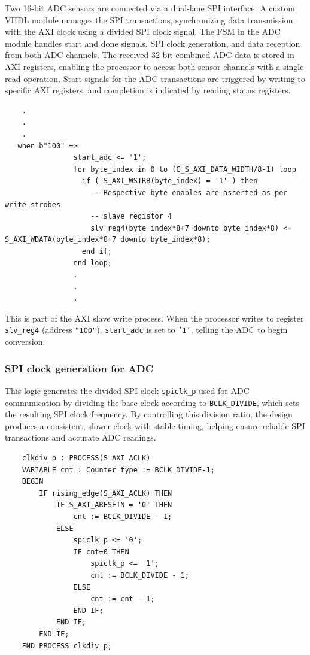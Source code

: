 Two 16-bit ADC sensors are connected via a dual-lane SPI interface. A custom VHDL module manages the SPI transactions, synchronizing data transmission with the AXI clock using a divided SPI clock signal. The FSM in the ADC module handles start and done signals, SPI clock generation, and data reception from both ADC channels. The received 32-bit combined ADC data is stored in AXI registers, enabling the processor to access both sensor channels with a single read operation. Start signals for the ADC transactions are triggered by writing to specific AXI registers, and completion is indicated by reading status registers.

\begin{verbatim}
	.
	.
	.
   when b"100" =>
	            start_adc <= '1';
	            for byte_index in 0 to (C_S_AXI_DATA_WIDTH/8-1) loop
	              if ( S_AXI_WSTRB(byte_index) = '1' ) then
	                -- Respective byte enables are asserted as per write strobes                   
	                -- slave registor 4
	                slv_reg4(byte_index*8+7 downto byte_index*8) <= S_AXI_WDATA(byte_index*8+7 downto byte_index*8);
	              end if;
	            end loop;
	            .
	            .
	            .
\end{verbatim}
This is part of the AXI slave write process. When the processor writes to register \texttt{slv\_reg4} (address \texttt{"100"}), \texttt{start\_adc} is set to \texttt{'1'}, telling the ADC to begin conversion.

\subsubsection{SPI clock generation for ADC}
This logic generates the divided SPI clock \texttt{spiclk\_p} used for ADC communication by dividing the base clock according to \texttt{BCLK\_DIVIDE}, which sets the resulting SPI clock frequency. By controlling this division ratio, the design produces a consistent, slower clock with stable timing, helping ensure reliable SPI transactions and accurate ADC readings.

\begin{verbatim}
	clkdiv_p : PROCESS(S_AXI_ACLK)
	VARIABLE cnt : Counter_type := BCLK_DIVIDE-1;
	BEGIN
	    IF rising_edge(S_AXI_ACLK) THEN
	        IF S_AXI_ARESETN = '0' THEN
	            cnt := BCLK_DIVIDE - 1;
	        ELSE
	            spiclk_p <= '0';
	            IF cnt=0 THEN
	                spiclk_p <= '1';
	                cnt := BCLK_DIVIDE - 1;
	            ELSE
	                cnt := cnt - 1;
	            END IF;
	        END IF;
	    END IF; 
	END PROCESS clkdiv_p;
\end{verbatim}

